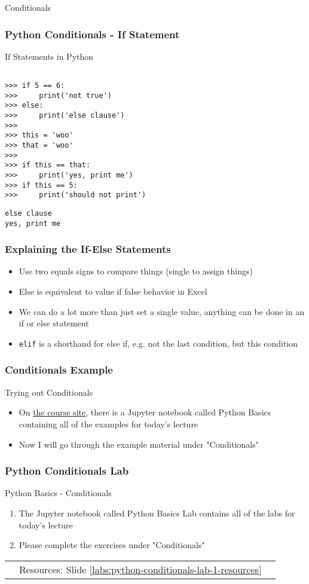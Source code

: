 \documentclass[handout, 11pt]{beamer}
\begin{document}
\begin{section}{Conditionals}
\begin{frame}[fragile]
\frametitle{Python Conditionals - If Statement}
\begin{block}{If Statements in Python}
\small
\begin{verbatim}

>>> if 5 == 6:
>>>     print('not true')
>>> else:
>>>     print('else clause')
>>> 
>>> this = 'woo'
>>> that = 'woo'
>>> 
>>> if this == that:
>>>     print('yes, print me')
>>> if this == 5:
>>>     print('should not print')

\end{verbatim}
\texttt{else clause}
\\
\texttt{yes, print me}
\end{block}
\end{frame}
\begin{frame}
\frametitle{Explaining the If-Else Statements}
\begin{itemize}
\item Use two equals signs to compare things (single to assign things)
\vfill
\item Else is equivalent to value if false behavior in Excel
\vfill
\item We can do a lot more than just set a single value, anything can be done in an if or else statement
\vfill
\item \texttt{elif}
 is a shorthand for else if, e.g. not the last condition, but this condition
\end{itemize}
\end{frame}
\begin{frame}
\frametitle{Conditionals Example}
{
\begin{block}{Trying out Conditionals}
\begin{itemize}
\item On \textcolor{blue}{\underline{\href{https://nickderobertis.github.io/fin-model-course/}{the course site}}}, there is a Jupyter notebook called Python Basics containing all of the examples for today's lecture
\item Now I will go through the example material under "Conditionals"
\end{itemize}
\end{block}
}
\end{frame}
\begin{frame}
\frametitle{Python Conditionals Lab}
{
\begin{block}{Python Basics - Conditionals}
\begin{enumerate}
\item The Jupyter notebook called Python Basics Lab contains all of the labs for today's lecture
\item Please complete the exercises under "Conditionals"
\end{enumerate}
\vfill
\begin{tabular*}{\textwidth}{@{\extracolsep{\fill}}ccc}
\toprule
\hfill & Resources: Slide \textcolor{blue}{\underline{\ref{labs:python-conditionals-lab-1-resources}}} & \hfill\\


\end{tabular*}
\end{block}}
\end{frame}
\end{section}
\end{document}
